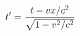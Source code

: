 \documentclass[preview]{standalone}
\begin{document}
\begin{align*}
\special{dvisvgm:raw <g id='unique000'>}t' = \frac{t - vx/c^2}{\sqrt{1 - v^2/c^2}}\special{dvisvgm:raw </g>}
\end{align*}
\end{document}
